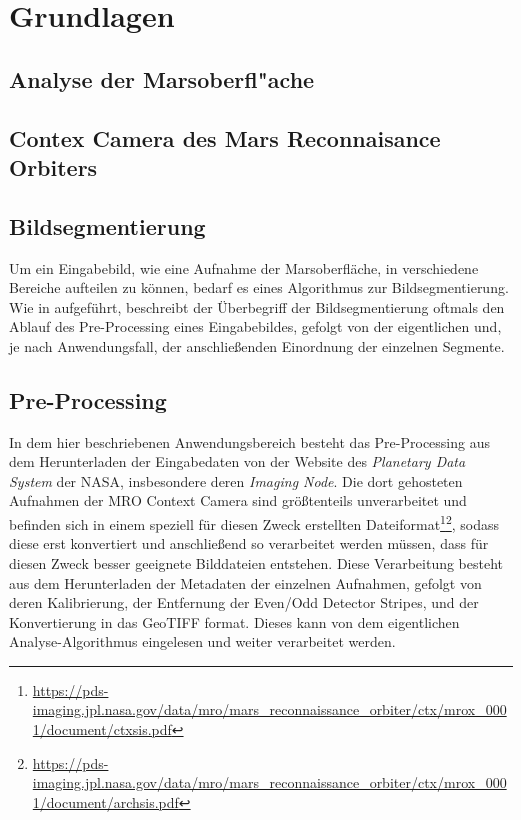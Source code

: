 \chapter{Grundlagen}
\label{chap:grundlagen}

\section{Analyse der Marsoberfl"ache}
\label{sec:analysedermarsoberflache}


\section{Contex Camera des Mars Reconnaisance Orbiters}
\label{sec:mroctx}

\section{Bildsegmentierung}
\label{sec:segmentierung}

Um ein Eingabebild, wie \zB eine Aufnahme der Marsoberfläche, in verschiedene Bereiche aufteilen zu können, bedarf es eines Algorithmus zur Bildsegmentierung. Wie in \cite{bildsegmentierung} aufgeführt, beschreibt der Überbegriff der Bildsegmentierung oftmals den Ablauf des Pre-Processing eines Eingabebildes, gefolgt von der eigentlichen  und, je nach Anwendungsfall, der anschließenden Einordnung der einzelnen Segmente.

\section{Pre-Processing}
\label{sec:preprocessing}

In dem hier beschriebenen Anwendungsbereich besteht das Pre-Processing aus dem Herunterladen der Eingabedaten von der Website des \textit{Planetary Data System} der NASA, insbesondere deren \textit{Imaging Node}\cite{pds}. Die dort gehosteten Aufnahmen der MRO Context Camera sind größtenteils unverarbeitet und befinden sich in einem speziell für diesen Zweck erstellten Dateiformat\footnote{\url{https://pds-imaging.jpl.nasa.gov/data/mro/mars\_reconnaissance\_orbiter/ctx/mrox\_0001/document/ctxsis.pdf}}\footnote{\url{https://pds-imaging.jpl.nasa.gov/data/mro/mars\_reconnaissance\_orbiter/ctx/mrox\_0001/document/archsis.pdf}}, sodass diese erst konvertiert und anschließend so verarbeitet werden müssen, dass für diesen Zweck besser geeignete Bilddateien entstehen.
Diese Verarbeitung besteht aus dem Herunterladen der Metadaten der einzelnen Aufnahmen, gefolgt von deren Kalibrierung, der Entfernung der Even/Odd Detector Stripes, und der Konvertierung in das GeoTIFF format. Dieses kann von dem eigentlichen Analyse-Algorithmus eingelesen und weiter verarbeitet werden.

